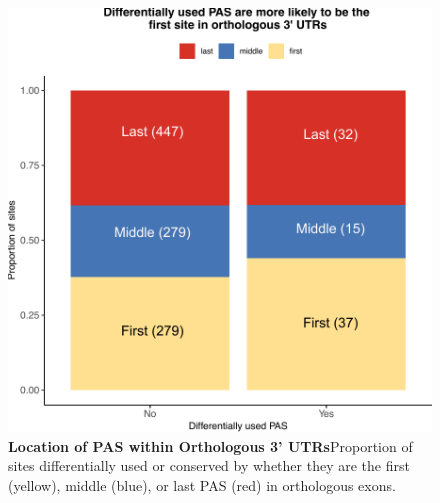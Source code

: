 \begin{figure}[!htb]
\centering
\includegraphics[width=5in]{img/ch03/Fig2-figSup2.pdf}
\caption[Location of PAS within Orthologous 3' UTRs]{\textbf{Location of PAS within Orthologous 3' UTRs}Proportion of sites differentially used or conserved by whether they are the first (yellow), middle (blue), or last PAS (red) in orthologous exons. }
\label{fig:ch03-whichUTR}
\end{figure}
\clearpage

